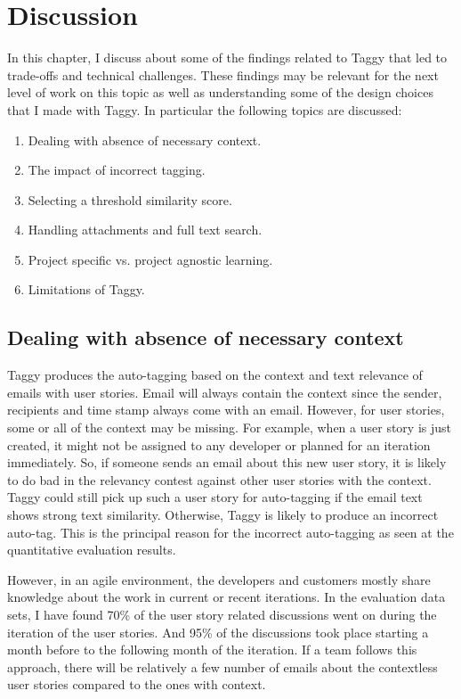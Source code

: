 \fancyhead[RO,LE]{\thepage}
\fancyfoot{} 
\chapter{Discussion}
\label{ch:discussion}
In this chapter, I discuss about some of the findings related to Taggy that led to trade-offs and technical challenges. These findings may be relevant for the next level of work on this topic as well as understanding some of the design choices that I made with Taggy. In particular the following topics are discussed:

\begin{enumerate}
	\item Dealing with absence of necessary context.
	\item The impact of incorrect tagging.
	\item Selecting a threshold similarity score.	
	\item Handling attachments and full text search.	
	\item Project specific vs. project agnostic learning.
	\item Limitations of Taggy.
\end{enumerate}

\section{Dealing with absence of necessary context}
Taggy produces the auto-tagging based on the context and text relevance of emails with user stories. Email will always contain the context since the sender, recipients and time stamp always come with an email. However, for user stories, some or all of the context may be missing. For example, when a user story is just created, it might not be assigned to any developer or planned for an iteration immediately. So, if someone sends an email about this new user story, it is likely to do bad in the relevancy contest against other user stories with the context. Taggy could still pick up such  a user story for auto-tagging if the email text shows strong text similarity. Otherwise, Taggy is likely to produce an incorrect auto-tag. This is the principal reason for the incorrect auto-tagging as seen at the quantitative evaluation results.

However, in an agile environment, the developers and customers mostly share knowledge about the work in current or recent iterations. In the evaluation data sets, I have found 70\% of the user story related discussions went on during the iteration of the user stories. And 95\% of the discussions took place starting a month before to the following month of the iteration. If a team follows this approach, there will be relatively a few number of emails about the contextless user stories compared to the ones with context.


